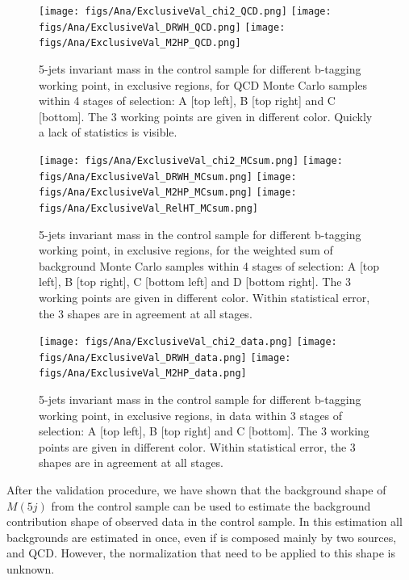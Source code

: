 \begin{figure}[!Hhtbp]
  \begin{center}
    \texttt{[image: figs/Ana/ExclusiveVal\_chi2\_QCD.png]}
    \texttt{[image: figs/Ana/ExclusiveVal\_DRWH\_QCD.png]}
    \texttt{[image: figs/Ana/ExclusiveVal\_M2HP\_QCD.png]}
    \caption{5-jets invariant mass in the control sample for different b-tagging working point, in exclusive regions, for QCD Monte Carlo samples within 4 stages of selection: A [top left], B [top right] and C [bottom]. The 3 working points are given in different color. Quickly a lack of statistics is visible.}
    \label{fig:StageExWPQCD}
  \end{center}
\end{figure}

\begin{figure}[!Hhtbp]
  \begin{center}
    \texttt{[image: figs/Ana/ExclusiveVal\_chi2\_MCsum.png]}
    \texttt{[image: figs/Ana/ExclusiveVal\_DRWH\_MCsum.png]}
    \texttt{[image: figs/Ana/ExclusiveVal\_M2HP\_MCsum.png]}
    \texttt{[image: figs/Ana/ExclusiveVal\_RelHT\_MCsum.png]}
    \caption{5-jets invariant mass in the control sample for different b-tagging working point, in exclusive regions, for the weighted sum of background Monte Carlo samples within 4 stages of selection: A [top left], B [top right], C [bottom left] and D [bottom right]. The 3 working points are given in different color. Within statistical error, the 3 shapes are in agreement at all stages.}
    \label{fig:StageExWPSum}
  \end{center}
\end{figure}

\begin{figure}[!Hhtbp]
  \begin{center}
    \texttt{[image: figs/Ana/ExclusiveVal\_chi2\_data.png]}
    \texttt{[image: figs/Ana/ExclusiveVal\_DRWH\_data.png]}
    \texttt{[image: figs/Ana/ExclusiveVal\_M2HP\_data.png]}
    \caption{5-jets invariant mass in the control sample for different b-tagging working point, in exclusive regions, in data within 3 stages of selection: A [top left], B [top right] and C [bottom]. The 3 working points are given in different color. Within statistical error, the 3 shapes are in agreement at all stages.}
    \label{fig:StageExWPData}
  \end{center}
\end{figure}

After the validation procedure, we have shown that the background shape of $M(5j)$ from the control sample can be used to estimate the background contribution shape of observed data in the control sample. In this estimation all backgrounds are estimated in once, even if is composed mainly by two sources, \ttbar and QCD. However, the normalization that need to be applied to this shape is unknown. 

